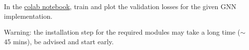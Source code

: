 \documentclass[12pt,letterpaper]{article}
\begin{document}
\begin{enumerate}[resume]
In the \href{https://colab.research.google.com/drive/134BYnBf7AtR_ym7To-SAs39cPP1KGIOS?usp=sharing}{colab notebook}, train and plot the validation losses for the given GNN implementation.


\end{enumerate}

Warning: the installation step for the required modules may take a long time ($\sim$45 mins), be advised and start early.

\end{document}
